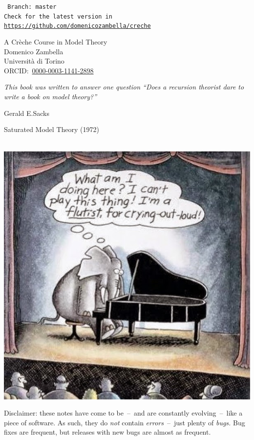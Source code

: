 \documentclass[10pt,openany]{book}
\theoremstyle{mio}
\newcommand\branch{master}
\begin{document}
\raggedbottom
\begin{titlepage}
\begin{flushright}
\tt
Branch:\ \branch\ \DTMnow\\[.5ex]
Check for the latest version in\\[.5ex]
\href{https://github.com/domenicozambella/creche}{\tt https://github.com/domenicozambella/creche}
\end{flushright}
\vspace*{2ex}

{\Large A Cr\`eche Course in Model Theory}\\[2ex]%

Domenico Zambella\\[.5ex]
Universit\`a di Torino\\[.5ex]
ORCID:~\href{https://orcid.org/0000-0003-1141-2898}%
{0000-0003-1141-2898}\\[15ex]

\hfill
\begin{minipage}{.7\textwidth}
  \sl This book was written to answer one question ``Does a recursion theorist dare to write a book on model theory?''

\hfill Gerald E.\@ Sacks

\hfill Saturated Model Theory (1972)
\end{minipage}\\[8ex]

\hfill
\includegraphics[width=.5\textwidth]{elephant_playing_piano.jpg}
\hspace*{.1\textwidth}

\vfill
\hrulefill\par
\footnotesize
Disclaimer: these notes have come to be~--~and are constantly evolving~--~like a piece of software.
As such, they do \textit{not\/} contain \textit{errors}~--~just plenty of \textit{bugs.}
Bug fixes are frequent, but releases with new bugs are almost as frequent.

\end{titlepage}
\end{document}

